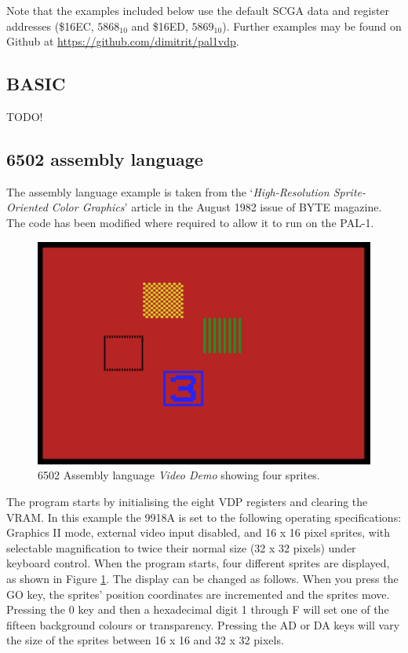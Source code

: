 \documentclass[a4paper,11pt,twoside,openright]{report}
\begin{document}
Note that the examples included below use the default SCGA data and register addresses (\$16EC, $5868_{10}$ and \$16ED, $5869_{10}$).  Further examples may be found on Github at \url{https://github.com/dimitrit/pal1vdp}.

\subsection*{BASIC}

\textsf{TODO!}


\subsection*{6502 assembly language}

The assembly language example is taken from the `\textit{High-Resolution Sprite-Oriented Color Graphics}' article in the August 1982 issue of BYTE magazine.\cite[pp. 57--80]{byte1} The code has been modified where required to allow it to run on the PAL-1.

\begin{figure}[h!]
\centering
\includegraphics[scale=.7]{images/video-demo.png}
\caption[Assembly language Video Demo showing sprites]{6502 Assembly language \textit{Video Demo} showing four sprites.}
\label{fig:asmdemo}
\end{figure}

The program starts by initialising the eight VDP registers and clearing the VRAM. In this example the 9918A is set to the following operating specifications: Graphics II mode, external video input disabled, and 16 x 16 pixel sprites, with selectable magnification to twice their normal size (32 x 32 pixels) under keyboard control. When the program starts, four different sprites are displayed, as shown in Figure \ref{fig:asmdemo}. The display can be changed as follows. When you press the \textsf{GO} key, the sprites' position coordinates are incremented and the sprites move. Pressing the \textsf{0} key and then a hexadecimal digit \textsf{1} through \textsf{F} will set one of the fifteen background colours or transparency. Pressing the \textsf{AD} or \textsf{DA} keys will vary the size of the sprites between 16 x 16 and 32 x 32 pixels.
\end{document}
